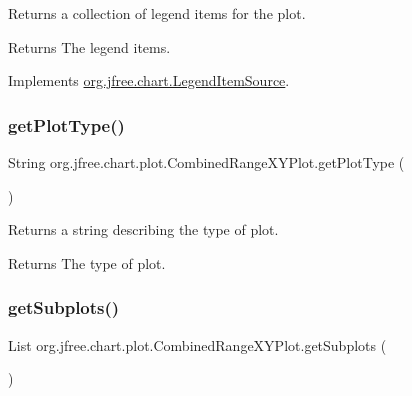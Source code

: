 Returns a collection of legend items for the plot.

\begin{DoxyReturn}{Returns}
The legend items. 
\end{DoxyReturn}


Implements \mbox{\hyperlink{interfaceorg_1_1jfree_1_1chart_1_1_legend_item_source_a224409463c4f7a8ef0e2a9df337e6d3b}{org.\+jfree.\+chart.\+Legend\+Item\+Source}}.

\mbox{\label{classorg_1_1jfree_1_1chart_1_1plot_1_1_combined_range_x_y_plot_a1c1935dd9b3b11c558a19242034bae5a}} 
\subsubsection{\texorpdfstring{get\+Plot\+Type()}{getPlotType()}}
{\footnotesize\ttfamily String org.\+jfree.\+chart.\+plot.\+Combined\+Range\+X\+Y\+Plot.\+get\+Plot\+Type (\begin{DoxyParamCaption}{ }\end{DoxyParamCaption})}

Returns a string describing the type of plot.

\begin{DoxyReturn}{Returns}
The type of plot. 
\end{DoxyReturn}
\mbox{\label{classorg_1_1jfree_1_1chart_1_1plot_1_1_combined_range_x_y_plot_aa7e90a3d5824b905a8516de92ee0ca31}} 
\subsubsection{\texorpdfstring{get\+Subplots()}{getSubplots()}}
{\footnotesize\ttfamily List org.\+jfree.\+chart.\+plot.\+Combined\+Range\+X\+Y\+Plot.\+get\+Subplots (\begin{DoxyParamCaption}{ }\end{DoxyParamCaption})}

